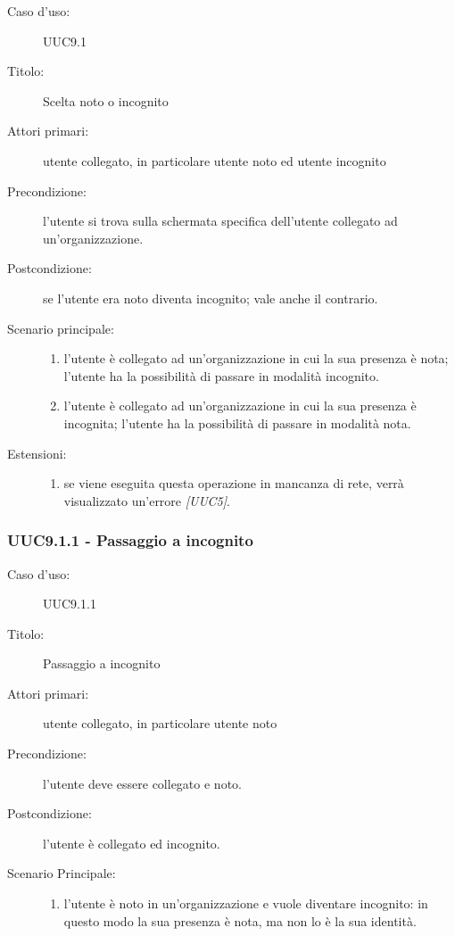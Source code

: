\documentclass[../analisi-dei-requisiti.tex]{subfiles}
\begin{document}
\begin{description}
  \item[Caso d’uso:] UUC9.1
  \item[Titolo:] Scelta noto o incognito
  \item[Attori primari:] utente collegato, in particolare utente noto ed utente incognito
  \item[Precondizione:] l'utente si trova sulla schermata specifica dell'utente collegato ad un'organizzazione.
  \item[Postcondizione:] se l'utente era noto diventa incognito; vale anche il contrario.
  \item[Scenario principale:]
        \begin{enumerate}
          \item l'utente è collegato ad un'organizzazione in cui la sua presenza è nota; l'utente ha la possibilità di passare in modalità incognito.
          \item l'utente è collegato ad un'organizzazione in cui la sua presenza è incognita; l'utente ha la possibilità di passare in modalità nota.
        \end{enumerate}
  \item[Estensioni:]
        \begin{enumerate}
          \item se viene eseguita questa operazione in mancanza di rete, verrà visualizzato un'errore \emph{[UUC5]}.
        \end{enumerate}
\end{description}

\subsubsection{UUC9.1.1 - Passaggio a incognito}%
\label{subsub:UUC9.1.1utente}
\begin{description}
  \item[Caso d’uso:] UUC9.1.1
  \item[Titolo:] Passaggio a incognito
  \item[Attori primari:] utente collegato, in particolare utente noto
  \item[Precondizione:] l'utente deve essere collegato e noto.
  \item[Postcondizione:] l'utente è collegato ed incognito.
  \item[Scenario Principale:]
        \begin{enumerate}
          \item l'utente è noto in un'organizzazione e vuole diventare incognito: in questo modo la sua presenza è nota, ma non lo è la sua identità.
        \end{enumerate}
\end{description}
\end{document}
